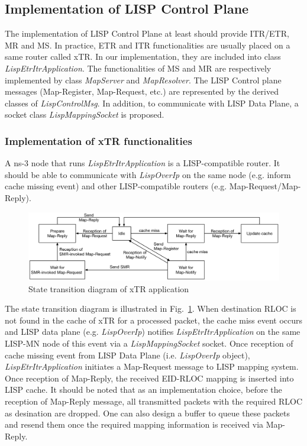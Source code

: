 \subsection{Implementation of LISP Control Plane}
\label{subsec:control-plane-impl}
The implementation of LISP Control Plane at least should provide ITR/ETR, MR and MS. In practice, ETR and ITR functionalities are usually placed on a same router called xTR. In our implementation, they are included into class \emph{LispEtrItrApplication}.
The functionalities of MS and MR are respectively implemented by class \emph{MapServer} and \emph{MapResolver}. The LISP Control plane messages (Map-Register, Map-Request, etc.) are represented by the derived classes of \emph{LispControlMsg}. In addition, to communicate with LISP Data Plane, a socket class \emph{LispMappingSocket} is proposed.

\subsubsection{Implementation of xTR functionalities}
A ns-3 node that runs \emph{LispEtrItrApplication} is a LISP-compatible router. It should be able to communicate with \emph{LispOverIp} on the same node (e.g. inform cache missing event) and other LISP-compatible routers (e.g. Map-Request/Map-Reply). 
\begin{figure}[!t]
	\centering
	\includegraphics[width=\textwidth]{Pics/xTR_state_transition.eps}
	\caption{State transition diagram of xTR application}
	\label{fig:xTR-state-transition}
\end{figure}
The state transition diagram is illustrated in Fig.~\ref{fig:xTR-state-transition}. When destination RLOC is not found in the cache of xTR for a processed packet, the cache miss event occurs and LISP data plane (e.g. \emph{LispOverIp}) notifies \emph{LispEtrItrApplication} on the same LISP-MN node of this event via a \emph{LispMappingSocket} socket. Once reception of cache missing event from LISP Data Plane (i.e. \emph{LispOverIp} object), \emph{LispEtrItrApplication} initiates a Map-Request message to LISP mapping system. Once reception of Map-Reply, the received EID-RLOC mapping is inserted into LISP cache. 
It should be noted that as an implementation choice, before the reception of Map-Reply message, all transmitted packets with the required RLOC as desination are dropped. One can also design a buffer to queue these packets and resend them once the required mapping information is received via Map-Reply.

